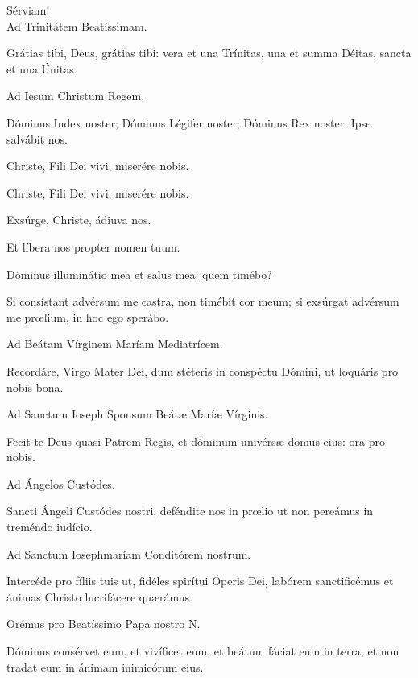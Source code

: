 \begin{multicols}{2}

\renewcommand{\columnseprulecolor}{\color{rubrica}}
\renewcommand{\columnseprule}{0.4pt}

{}
Sérviam!\\

 
 \va  Ad Trinitátem Beatíssimam.
 
 \ra Grátias tibi, Deus, grátias tibi: vera et una Trínitas, una et summa Déitas, sancta et una Únitas.
 
\bigskip
 \va  Ad Iesum Christum Regem.
 
 \ra Dóminus Iudex noster; Dóminus Légifer noster; Dóminus Rex noster. Ipse salvábit nos.
 
\bigskip
 \va  Christe, Fili Dei vivi, miserére nobis.
 
 \ra Christe, Fili Dei vivi, miserére nobis.
 
\bigskip
 \va  Exsúrge, Christe, ádiuva nos.
 
 \ra Et líbera nos propter nomen tuum.
 
\bigskip
 \va  Dóminus illuminátio mea et salus mea: quem timébo?
 
 \ra Si consístant advérsum me cas\-tra, non timébit cor meum; si exsúrgat advérsum me pr\oe lium, in hoc ego sperábo.
 
\bigskip
 \va  Ad Beátam Vírginem Maríam Mediatrícem.
 
 \ra Recordáre, Virgo Mater Dei, dum stéteris in conspéctu Dómini, ut loquáris pro nobis bona.
 
\bigskip
 \va  Ad Sanctum Ioseph Sponsum Beátæ Maríæ Vírginis.
 
 \ra Fecit te Deus quasi Patrem Regis, et dóminum univérsæ domus eius: ora pro nobis.
 
\bigskip
 \va  Ad Ángelos Custódes.
 
 \ra Sancti Ángeli Custódes nostri, deféndite nos in pr\oe lio ut non pereámus in treméndo iudício.
 
\bigskip
 \va  Ad Sanctum Iosephmaríam Conditórem nostrum.
 
 \ra Intercéde pro fíliis tuis ut, fidéles spirítui Óperis Dei, labórem sanctificémus et ánimas Christo lucrifácere quærámus.
 
\bigskip
 \va  Orémus pro Beatíssimo Papa nostro {\color{rubrica}N}.

 \ra Dóminus consérvet eum, et vivíficet eum, et beátum fáciat eum in terra, et non tradat eum in ánimam inimicórum eius.
 

\end{multicols}
